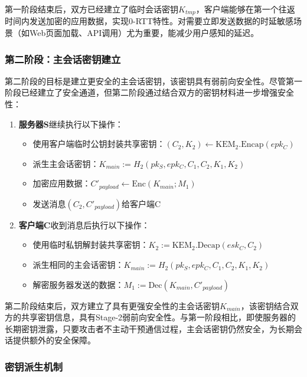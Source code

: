 第一阶段结束后，双方已经建立了临时会话密钥$K_{tmp}$，客户端能够在第一个往返时间内发送加密的应用数据，实现0-RTT特性。对需要立即发送数据的时延敏感场景（如Web页面加载、API调用）尤为重要，能减少用户感知的延迟。

\subsubsection{第二阶段：主会话密钥建立}

第二阶段的目标是建立更安全的主会话密钥，该密钥具有弱前向安全性。尽管第一阶段已经建立了安全通道，但第二阶段通过结合双方的密钥材料进一步增强安全性：
\begin{enumerate}
    \item \textbf{服务器S}继续执行以下操作：
    \begin{itemize}
        \item 使用客户端临时公钥封装共享密钥：$(C_2, K_2) \leftarrow \text{KEM}_2.\text{Encap}(epk_C)$
        \item 派生主会话密钥：$K_{main} := H_2(pk_S, epk_C, C_1, C_2, K_1, K_2)$
        \item 加密应用数据：$C'_{payload} \leftarrow \text{Enc}(K_{main}; M_1)$
        \item 发送消息$(C_2, C'_{payload})$给客户端C
    \end{itemize}

    \item \textbf{客户端C}收到消息后执行以下操作：
    \begin{itemize}
        \item 使用临时私钥解封装共享密钥：$K_2 := \text{KEM}_2.\text{Decap}(esk_C, C_2)$
        \item 派生相同的主会话密钥：$K_{main} := H_2(pk_S, epk_C, C_1, C_2, K_1, K_2)$
        \item 解密服务器发送的数据：$M_1 := \text{Dec}(K_{main}, C'_{payload})$
    \end{itemize}
\end{enumerate}

第二阶段结束后，双方建立了具有更强安全性的主会话密钥$K_{main}$，该密钥结合双方的共享密钥信息，具有Stage-2弱前向安全性。与第一阶段相比，即使服务器的长期密钥泄露，只要攻击者不主动干预通信过程，主会话密钥仍然安全，为长期会话提供额外的安全保障。

\subsubsection{密钥派生机制}

